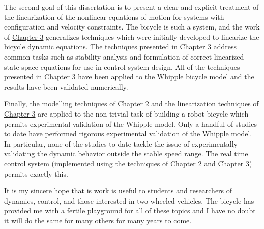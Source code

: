 The second goal of this dissertation is to present a clear and explicit
treatment of the linearization of the nonlinear equations of motion for systems
with configuration and velocity constraints. The bicycle is such a system, and
the work of \hyperref[chapter3]{Chapter 3} generalizes techniques which were
initially developed to linearize the bicycle dynamic equations. The techniques
presented in \hyperref[chapter3]{Chapter 3} address common tasks such as
stability analysis and formulation of correct linearized state space equations
for use in control system design. All of the techniques presented in
\hyperref[chapter3]{Chapter 3} have been applied to the Whipple bicycle model
and the results have been validated numerically.

Finally, the modelling techniques of \hyperref[chapter2]{Chapter 2} and the
linearization techniques of \hyperref[chapter3]{Chapter 3} are applied to the
non trivial task of building a robot bicycle which permits experimental
validation of the Whipple model. Only a handful of studies to date have
performed rigorous experimental validation of the Whipple model. In particular,
none of the studies to date tackle the issue of experimentally validating the
dynamic behavior outside the stable speed range. The real time control system
(implemented using the techniques of \hyperref[chapter2]{Chapter 2} and
\hyperref[chapter3]{Chapter 3}) permits exactly this.

It is my sincere hope that is work is useful to students and researchers of
dynamics, control, and those interested in two-wheeled vehicles. The bicycle
has provided me with a fertile playground for all of these topics and I have no
doubt it will do the same for many others for many years to come.
